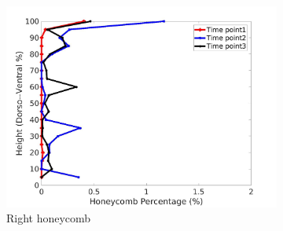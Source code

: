 \begin{figure}[H]
\begin{subfigure}{.42\linewidth}
  \includegraphics[width=\linewidth,trim={{.0\wd0} {.0\wd0} {.0\wd0} {.0\wd0}},clip]{Appendix/Image_AppexA/DorsoToVentral/IPF21RightLungHoneycombDiseaseDorsoToVentral.jpg}
  \caption{Right honeycomb}
  \label{fig:IPF21DiseaseDorsoToVentral-f}
\end{subfigure}
\begin{subfigure}{.42\linewidth}%

\end{subfigure}
\end{figure}
